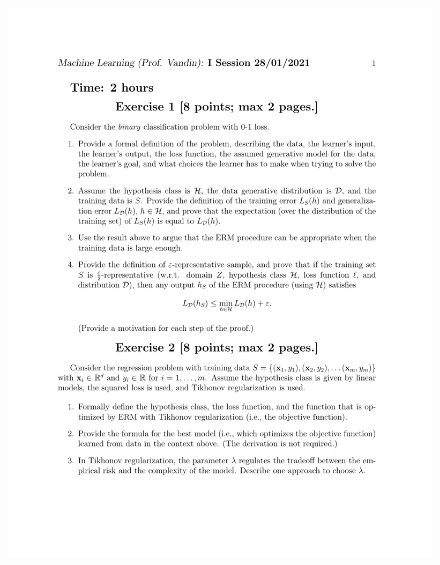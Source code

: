 \documentclass[a4paper,11pt,oneside]{book}
\begin{document}
\begin{figure}[H]
\begin{minipage}{0.45\textwidth}
        \includegraphics[width=\textwidth,page=2]{images/28_Jan_2021.pdf}
    \end{minipage}
    
    \vspace{1cm}
    

\end{figure}
\end{document}
